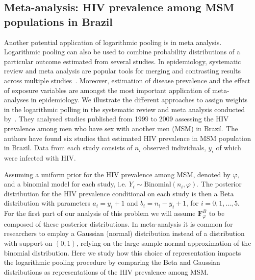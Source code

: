 \documentclass[a4paper, notitlepage, 10pt]{article}
\begin{document}
\subsection{Meta-analysis: HIV prevalence among MSM populations in Brazil}
\label{sec:metaAnalysis}

Another potential application of logarithmic pooling is in meta analysis.
Logarithmic pooling can also be used to combine probability distributions of a particular outcome estimated from several studies. 
In epidemiology, systematic review and meta analysis are popular tools for merging and contrasting results across multiple studies~\citep[Chapter 33]{Rothman2008}.
Moreover, estimation of disease prevalence and the effect of exposure variables are amongst the most important application of meta-analyses in epidemiology.
We illustrate the different approaches to assign weights in the logarithmic polling in the systematic review and meta analysis conducted by~\citet{malta2010hiv}. 
They analysed studies published from 1999 to 2009 assessing the HIV prevalence among men who have sex with another men (MSM) in Brazil. 
The authors have found six studies that estimated HIV prevalence in MSM population in Brazil. 
Data from each study consists of $n_i$ observed individuals, $y_i$ of which were infected with HIV.

Assuming a uniform prior for the HIV prevalence among MSM, denoted by $\varphi$, and a binomial model for each study, i.e. $Y_i \sim \text{Binomial}(n_i, \varphi)$. 
The posterior distribution for the HIV prevalence conditional on each study is then a Beta distribution with parameters $a_i = y_i + 1$ and $b_i = n_i - y_i + 1$, for $i=0,1, \ldots, 5$.
For the first part of our analysis of this problem we will assume $\boldsymbol F^{B}_\varphi$ to be composed of these posterior distributions.
In meta-analysis it is common for researchers to employ a Gaussian (normal) distribution instead of a distribution with support on $(0, 1)$, relying on the large sample normal approximation of the binomial distribution. 
Here we study how this choice of representation impacts the logarithmic pooling procedure by comparing the Beta and Gaussian distributions as representations of the HIV prevalence among MSM.
\end{document}
